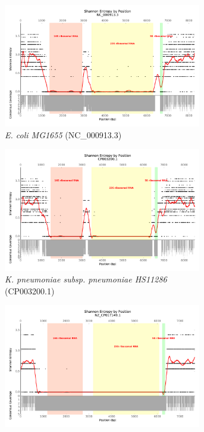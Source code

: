 \documentclass[10pt]{article}
\begin{document}
\begin{figure}[H]
  \centering
  \begin{subfigure}[b]{.45\textwidth}
    \includegraphics[width=0.95\textwidth]{gage_entropy_figures/NC_000913.3_entropy_plot}
    \caption{\textit{E. coli MG1655} (NC\_000913.3)}
    \label{fig:ent_coli}
  \end{subfigure}
  \begin{subfigure}[b]{.45\textwidth}
    \includegraphics[width=0.95\textwidth]{gage_entropy_figures/CP003200.1_entropy_plot}
    \caption{\textit{K. pneumoniae subsp. pneumoniae HS11286} (CP003200.1) }
    \label{fig:ent_pneumo}
  \end{subfigure}
  \begin{subfigure}[b]{.45\textwidth}
    \includegraphics[width=0.95\textwidth]{gage_entropy_figures/NZ_CP017149.1_entropy_plot}

\end{subfigure}
\end{figure}
\end{document}
